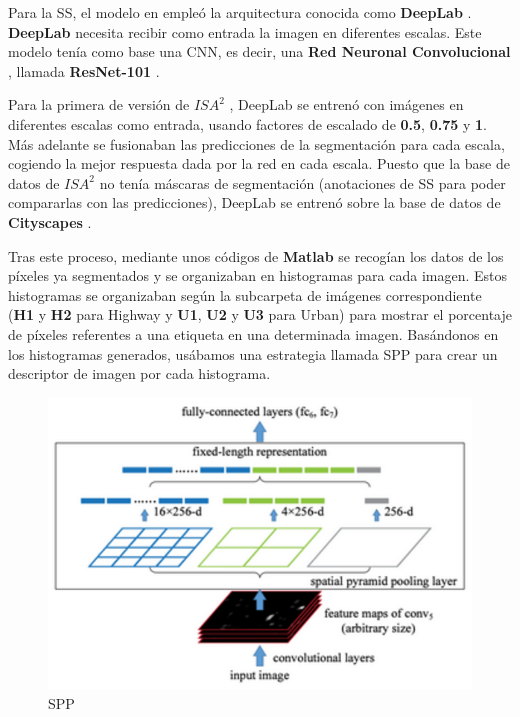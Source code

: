 Para la \ac{SS}, el modelo en \cite{isa2} empleó la arquitectura conocida como \textbf{DeepLab} \cite{deeplab}. \textbf{DeepLab} necesita recibir como entrada la imagen en diferentes escalas. Este modelo tenía como base una \ac{CNN}, es decir, una \textbf{Red Neuronal Convolucional} \cite{cnn}, llamada \textbf{ResNet-101} \cite{resnet}.

Para la primera de versión de $ISA^{2}$ \cite{isa2}, DeepLab se entrenó con imágenes en diferentes escalas como entrada, usando factores de escalado de \textbf{0.5}, \textbf{0.75} y \textbf{1}. Más adelante se fusionaban las predicciones de la segmentación para cada escala, cogiendo la mejor respuesta dada por la red en cada escala. Puesto que la base de datos de $ISA^{2}$ no tenía máscaras de segmentación (anotaciones de \ac{SS} para poder compararlas con las predicciones), DeepLab se entrenó sobre la base de datos de \textbf{Cityscapes} \cite{cityscapes}.
 


Tras este proceso, mediante unos códigos de \textbf{Matlab} se recogían los datos de los píxeles ya segmentados y se organizaban en histogramas para cada imagen. Estos histogramas se organizaban según la subcarpeta de imágenes correspondiente (\textbf{H1} y \textbf{H2} para Highway y \textbf{U1}, \textbf{U2} y \textbf{U3} para Urban) para mostrar el porcentaje de píxeles referentes a una etiqueta en una determinada imagen. Basándonos en los histogramas generados, usábamos una estrategia llamada \ac{SPP} \cite{spp} para crear un descriptor de imagen por cada histograma.

\begin{figure}[H]
\centering
\includegraphics[width=12cm]{Figuras/SPP.eps}
\caption{\ac{SPP}}
\label{fig:spp}
\end{figure}

